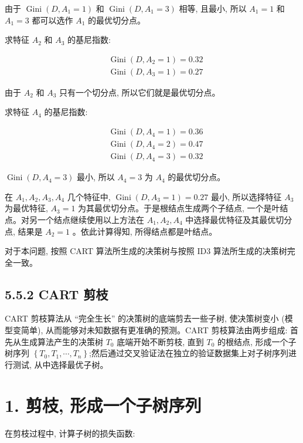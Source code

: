 \documentclass[10pt]{article}
\begin{document}
\begin{CJK*}{UTF8}{bsmi}
由于 $\operatorname{Gini}\left(D, A_{1}=1\right)$ 和 $\operatorname{Gini}\left(D, A_{1}=3\right)$ 相等, 且最小, 所以 $A_{1}=1$ 和 $A_{1}=3$ 都可以选作 $A_{1}$ 的最优切分点。

求特征 $A_{2}$ 和 $A_{3}$ 的基尼指数:

$$
\begin{aligned}
& \operatorname{Gini}\left(D, A_{2}=1\right)=0.32 \\
& \operatorname{Gini}\left(D, A_{3}=1\right)=0.27
\end{aligned}
$$

由于 $A_{2}$ 和 $A_{3}$ 只有一个切分点, 所以它们就是最优切分点。

求特征 $A_{4}$ 的基尼指数:

$$
\begin{aligned}
& \operatorname{Gini}\left(D, A_{4}=1\right)=0.36 \\
& \operatorname{Gini}\left(D, A_{4}=2\right)=0.47 \\
& \operatorname{Gini}\left(D, A_{4}=3\right)=0.32
\end{aligned}
$$

$\operatorname{Gini}\left(D, A_{4}=3\right)$ 最小, 所以 $A_{4}=3$ 为 $A_{4}$ 的最优切分点。

在 $A_{1}, A_{2}, A_{3}, A_{4}$ 几个特征中, $\operatorname{Gini}\left(D, A_{3}=1\right)=0.27$ 最小, 所以选择特征 $A_{3}$ 为最优特征, $A_{3}=1$ 为其最优切分点。于是根结点生成两个子结点, 一个是叶结点。对另一个结点继续使用以上方法在 $A_{1}, A_{2}, A_{4}$ 中选择最优特征及其最优切分点, 结果是 $A_{2}=1$ 。依此计算得知, 所得结点都是叶结点。

对于本问题, 按照 CART 算法所生成的决策树与按照 ID3 算法所生成的决策树完全一致。

\subsection*{5.5.2 CART 剪枝}
CART 剪枝算法从 “完全生长” 的决策树的底端剪去一些子树, 使决策树变小 (模型变简单), 从而能够对未知数据有更准确的预测。CART 剪枝算法由两步组成: 首先从生成算法产生的决策树 $T_{0}$ 底端开始不断剪枝, 直到 $T_{0}$ 的根结点, 形成一个子树序列 $\left\{T_{0}, T_{1}, \cdots, T_{n}\right\}$;然后通过交叉验证法在独立的验证数据集上对子树序列进行测试, 从中选择最优子树。

\section*{1. 剪枝, 形成一个子树序列}
在剪枝过程中, 计算子树的损失函数:



\end{CJK*}
\end{document}
